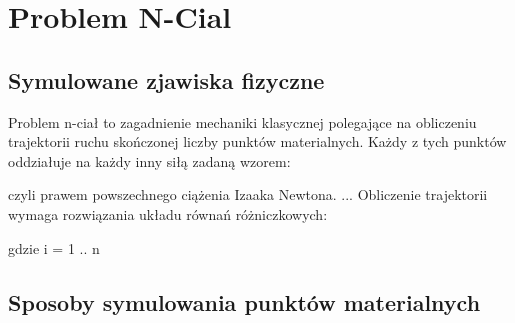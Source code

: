 
\section { Problem N-Cial }
\subsection {Symulowane zjawiska fizyczne}
Problem n-ciał to zagadnienie mechaniki klasycznej polegające na obliczeniu trajektorii ruchu skończonej liczby punktów materialnych. 
Każdy z tych punktów oddziałuje na każdy inny siłą zadaną wzorem:

\begin{center}
 
\end{center}

czyli prawem powszechnego ciążenia Izaaka Newtona.\linebreak
...
Obliczenie trajektorii wymaga rozwiązania układu równań różniczkowych:
\begin{center}
 gdzie i = 1 .. n 
\end{center}

\subsection {Sposoby symulowania punktów materialnych}
